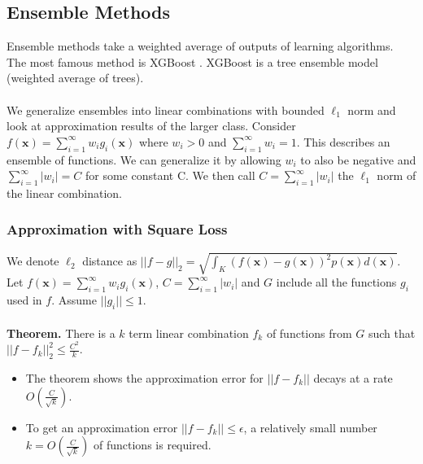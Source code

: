 \documentclass{article}
\begin{document}
   \subsection{Ensemble Methods}
   Ensemble methods take a weighted average of outputs of learning algorithms. The most famous method is XGBoost \cite{DBLP:journals/corr/ChenG16}. XGBoost is a tree ensemble model (weighted average of trees).
   \\\\
   We generalize ensembles into linear combinations with bounded $\ell_1$ norm and look at approximation results of the larger class. Consider $f(\mathbf{x})=\sum_{i=1}^{\infty} w_ig_i(\mathbf{x})$ where $w_i > 0$ and $\sum_{i=1}^{\infty} w_i = 1$. This describes an ensemble of functions. We can generalize it by allowing $w_i$ to also be negative and $\sum_{i=1}^{\infty} |w_i|=C$ for some constant C. We then call $C = \sum_{i=1}^{\infty} |w_i|$ the $\ell_1$ norm of the linear combination.
   
   \subsubsection{Approximation with Square Loss}
   We denote $\ell_2$ distance as $||f-g||_2 = \sqrt{\int_K (f(\mathbf{x})-g(\mathbf{x}))^2 p(\mathbf{x}) d(\mathbf{x})}$. Let $f(\mathbf{x})=\sum_{i=1}^{\infty} w_ig_i(\mathbf{x})$, $C = \sum_{i=1}^{\infty} |w_i|$ and $G$ include all the functions $g_i$ used in $f$. Assume $||g_i|| \leq 1$. 
   \\\\
   \textbf{Theorem.} There is a $k$ term linear combination $f_k$ of functions from $G$ such that $||f-f_k||_2^2 \leq \frac{C^2}{k}$.
   \begin{itemize}
   \item The theorem shows the approximation error for $||f-f_k||$ decays at a rate $O(\frac{C}{\sqrt{k}})$. 
   \item To get an approximation error $||f-f_k|| \leq \epsilon$, a relatively small number $k=O(\frac{C}{\sqrt{k}})$ of functions is required.
   \end{itemize}
   
\end{document}
